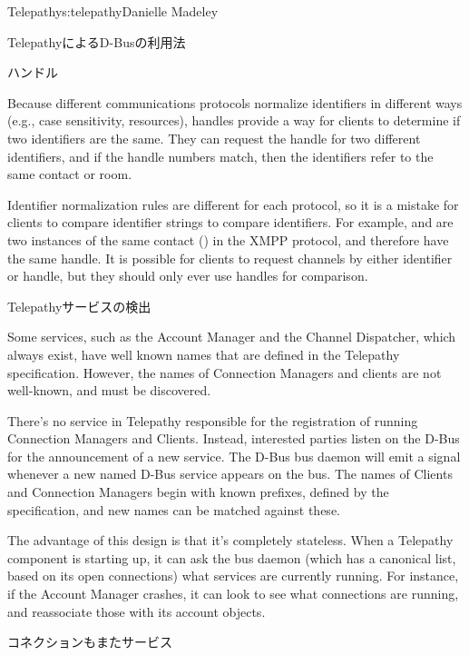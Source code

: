 \begin{aosachapter}{Telepathy}{s:telepathy}{Danielle Madeley}
\begin{aosasect1}{TelepathyによるD-Busの利用法}
\begin{aosasect2}{ハンドル}
\pagebreak

Because different communications protocols normalize identifiers in
different ways (e.g., case sensitivity, resources), handles provide a
way for clients to determine if two identifiers are the same. They can
request the handle for two different identifiers, and if the handle
numbers match, then the identifiers refer to the same contact or room.

Identifier normalization rules are different for each protocol, so it
is a mistake for clients to compare identifier strings to compare
identifiers. For example,  and
 are two instances of the same
contact () in the XMPP protocol, and therefore
have the same handle. It is possible for clients to request channels
by either identifier or handle, but they should only ever use handles
for comparison.

\end{aosasect2}

\begin{aosasect2}{Telepathyサービスの検出}

Some services, such as the Account Manager and the Channel Dispatcher,
which always exist, have well known names that are defined in the
Telepathy specification. However, the names of Connection Managers and
clients are not well-known, and must be discovered.

There's no service in Telepathy responsible for the registration of
running Connection Managers and Clients. Instead, interested parties
listen on the D-Bus for the announcement of a new service.  The D-Bus
bus daemon will emit a signal whenever a new named D-Bus service
appears on the bus. The names of Clients and Connection Managers begin
with known prefixes, defined by the specification, and new names can
be matched against these.

The advantage of this design is that it's completely stateless. When a
Telepathy component is starting up, it can ask the bus daemon (which
has a canonical list, based on its open connections) what services are
currently running.  For instance, if the Account Manager crashes, it
can look to see what connections are running, and reassociate those
with its account objects.

\begin{aosabox}{コネクションもまたサービス}


\end{aosabox}
\end{aosasect2}
\end{aosasect1}
\end{aosachapter}
